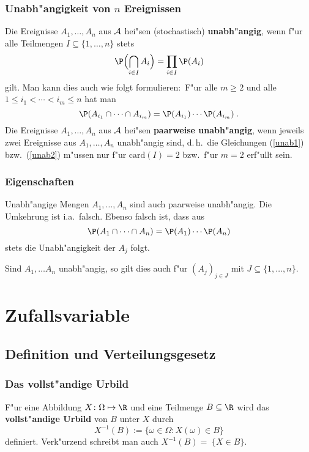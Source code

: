 \subsubsection{Unabh"angigkeit von $n$ Ereignissen}
Die Ereignisse $A_1,\ldots,A_n$ aus $\mathcal A$ hei"sen (stochastisch) \textbf{unabh"angig},
wenn f"ur alle Teilmengen $I\subseteq\{1,\ldots,n\}$ stets
\begin{equation}
\label{unab1}
\P\Bigl(\bigcap_{i\in I} A_i\Bigr)= \prod_{i\in I}\P(A_i)
\end{equation}
gilt. Man kann dies auch wie folgt formulieren$\colon$ F"ur alle $m\ge 2$ und alle
$1\le i_1<\cdots<i_m\le n$ hat man
\begin{equation}
\label{unab2}
\P(A_{i_1}\cap\cdots\cap A_{i_m})= \P(A_{i_1})\cdots\P(A_{i_m})\;.
\end{equation}
Die Ereignisse $A_1,\ldots,A_n$ aus $\mathcal A$ hei"sen \textbf{paarweise unabh"angig}, wenn
jeweils zwei Ereignisse aus $A_1,\ldots,A_n$ unabh"angig sind, d.\,h.~die Gleichungen
(\ref{unab1}) bzw.~(\ref{unab2}) m"ussen nur f"ur $\mathrm{card}(I)=2$ bzw.~f"ur $m=2$ erf"ullt sein.
\subsubsection{Eigenschaften}
Unabh"angige Mengen $A_1,\ldots,A_n$ sind auch paarweise unabh"angig. Die Umkehrung ist
i.a.~falsch. Ebenso falsch ist, dass aus
$$
\P(A_{1}\cap\cdots\cap A_{n})= \P(A_{1})\cdots\P(A_{n})
$$
stets die Unabh"angigkeit der $A_j$ folgt.

Sind $A_1,\ldots A_n$ unabh"angig, so gilt dies auch f"ur $(A_j)_{j\in J}$  mit
$J\subseteq \{1,\ldots,n\}$.

\section{Zufallsvariable}
\subsection{Definition und Verteilungsgesetz}

\subsubsection{Das vollst"andige Urbild}
F"ur eine Abbildung $X\colon\Omega\mapsto\R$ und eine Teilmenge $B\subseteq\R$ wird das
\textbf{vollst"andige Urbild} von $B$ unter $X$ durch
$$
X^{-1}(B):=\{\omega\in\Omega : X(\omega)\in B\}
$$
definiert. Verk"urzend schreibt man auch $X^{-1}(B)=\;\{X\in B\}$.
